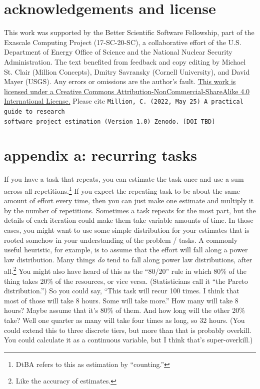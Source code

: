 \documentclass[12pt,oneside]{book}
\begin{document}
\chapter*{acknowledgements and license}
This work was supported by the Better Scientific Software Fellowship, part of the Exascale Computing Project (17-SC-20-SC), a collaborative effort of the U.S. Department of Energy Office of Science and the National Nuclear Security Administration. The text benefited from feedback and copy editing by Michael St. Clair (Million Concepts), Dmitry Savransky (Cornell University), and David Mayer (USGS). Any errors or omissions are the author's fault.
\hfill \break \hfill \break
\href{http://creativecommons.org/licenses/by-nc-sa/4.0/}{This work is licensed under a Creative Commons Attribution-NonCommercial-ShareAlike 4.0 International License.} Please cite
\hfill \break \hfill \break
\texttt{Million, C. (2022, May 25) A practical guide to research \\software project estimation (Version 1.0) Zenodo. [DOI TBD]}

\chapter*{appendix a: recurring tasks}

If you have a task that repeats, you can estimate the task once and use a sum across all repetitions.\footnote{DtBA refers to this as estimation by ``counting.''} If you expect the repeating task to be about the same amount of effort every time, then you can just make one estimate and multiply it by the number of repetitions. Sometimes a task repeats for the most part, but the details of each iteration could make them take variable amounts of time. In those cases, you might want to use some simple distribution for your estimates that is rooted somehow in your understanding of the problem / tasks. A commonly useful heuristic, for example, is to assume that the effort will fall along a power law distribution. Many things \emph{do} tend to fall along power law distributions, after all.\footnote{Like the accuracy of estimates.} You might also have heard of this as the ``80/20'' rule in which 80\% of the thing takes 20\% of the resources, or vice versa. (Statisticians call it ``the Pareto distribution.'') So you could say, ``This task will recur 100 times. I think that most of those will take 8 hours. Some will take more.'' How many will take 8 hours? Maybe assume that it's 80\% of them. And how long will the other 20\% take? Well one quarter as many will take four times as long, so 32 hours. (You could extend this to three discrete tiers, but more than that is probably overkill. You could calculate it as a continuous variable, but I think that's super-overkill.)
\end{document}
